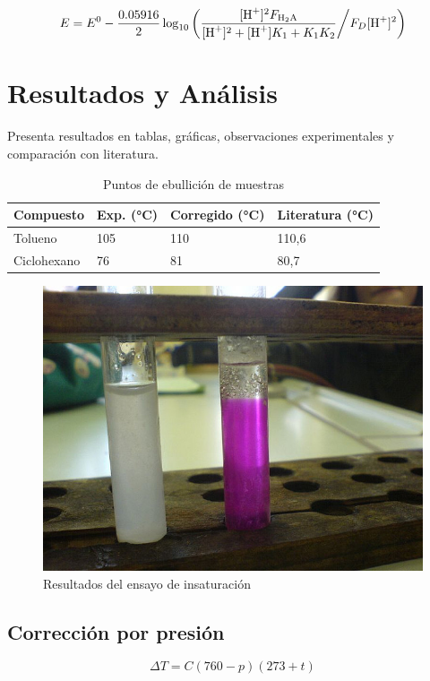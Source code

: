 \documentclass[letterpaper,12pt]{article}
\numberwithin{equation}{section}
\begin{document}
	\begin{tcolorbox}[colback=blue!5!white,colframe=blue!50!black,title=Ejemplo de cálculo]
		\begin{equation}
			E = E^0 - \frac{0.05916}{2} \log_{10} \left( \frac{[\ce{H+}]^2 F_{\ce{H2A}}}{[\ce{H+}]^2 + [\ce{H+}]K_1 + K_1 K_2} \middle/ F_D [\ce{H+}]^2 \right)
		\end{equation}
	\end{tcolorbox}
	
	\section{Resultados y Análisis}
	Presenta resultados en tablas, gráficas, observaciones experimentales y comparación con literatura.
	
	\begin{table}[H]
		\centering
		\begin{tabularx}{0.95\textwidth}{X X X X}
			\toprule
			\textbf{Compuesto} & \textbf{Exp. (\si{\degreeCelsius})} & \textbf{Corregido (\si{\degreeCelsius})} & \textbf{Literatura (\si{\degreeCelsius})} \\
			\midrule
			Tolueno & 105 & 110 & 110,6 \\
			Ciclohexano & 76 & 81 & 80,7 \\
			\bottomrule
		\end{tabularx}
		\caption{Puntos de ebullición de muestras}
	\end{table}
	
	\begin{figure}[H]
		\centering
		\includegraphics[width=0.6\linewidth]{images/tubes.jpg}
		\caption{Resultados del ensayo de insaturación}
		\label{fig:tubes}
	\end{figure}
	
	\subsection{Corrección por presión}
	\begin{equation}
		\Delta T = C(760 - p)(273 + t)
		\label{eq:bpcorrection}
	\end{equation}
	
\end{document}

